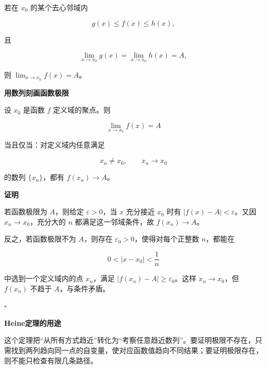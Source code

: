 \documentclass[fontset=fandol]{ctexart}
\newenvironment{extra}{\begin{mdframed}[style=extrastyle, frametitle={* 选读内容（不要求掌握）}]}{\end{mdframed}}
\newenvironment{custom}[1]{\par\noindent\textbf{#1}\quad}{\par\vspace{0.8em}}
\newenvironment{proofdetail}{\par\noindent\textbf{证明}\quad}{\hfill$\square$\par\vspace{0.8em}}
\begin{document}
\begin{theorem}[夹逼定理]

若在 \(x_0\) 的某个去心邻域内

\[

g(x)\leq f(x)\leq h(x),

\]

且

\[

\lim_{x\to x_0}g(x)=\lim_{x\to x_0}h(x)=A,

\]

则 \(\lim_{x\to x_0}f(x)=A\)。

\end{theorem}





\begin{extra}



\textbf{用数列刻画函数极限}



\begin{theorem}[Heine定理]

设 \(x_0\) 是函数 \(f\) 定义域的聚点。则

\[

\lim_{x\to x_0}f(x)=A

\]

当且仅当：对定义域内任意满足

\[

x_n\neq x_0,\qquad x_n\to x_0

\]

的数列 \(\{x_n\}\)，都有 \(f(x_n)\to A\)。

\end{theorem}

\begin{proofdetail}

若函数极限为 \(A\)，则给定 \(\varepsilon>0\)，当 \(x\) 充分接近 \(x_0\) 时有 \(|f(x)-A|<\varepsilon\)。又因 \(x_n\to x_0\)，充分大的 \(n\) 都满足这一邻域条件，故 \(f(x_n)\to A\)。



反之，若函数极限不为 \(A\)，则存在 \(\varepsilon_0>0\)，使得对每个正整数 \(n\)，都能在

\[

0<|x-x_0|<\frac1n

\]

中选到一个定义域内的点 \(x_n\)，满足 \(|f(x_n)-A|\geq\varepsilon_0\)。这样 \(x_n\to x_0\)，但 \(f(x_n)\) 不趋于 \(A\)，与条件矛盾。

\end{proofdetail}



\begin{custom}{Heine定理的用途}

这个定理把“从所有方式趋近”转化为“考察任意趋近数列”。要证明极限不存在，只需找到两列趋向同一点的自变量，使对应函数值趋向不同结果；要证明极限存在，则不能只检查有限几条路径。

\end{custom}



\end{extra}
\end{document}
